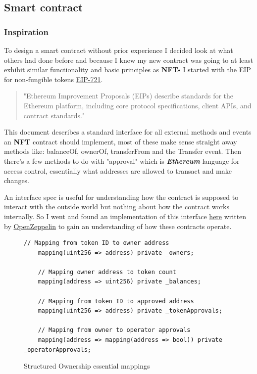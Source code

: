 \documentclass[12pt]{article}
\newcommand{\keyword}[1]{\textbf{\textit{#1}}}
\begin{document}
\subsection{Smart contract}

\subsubsection{Inspiration}

To design a smart contract without prior experience I decided look at what others had done before and because I knew my new contract was going to at least exhibit similar functionality and basic principles as \textbf{NFTs} I started with the EIP for non-fungible tokens \href{https://eips.ethereum.org/EIPS/eip-721}{EIP-721}. 

\begin{quote}
"Ethereum Improvement Proposals (EIPs) describe standards for the Ethereum platform, including core protocol specifications, client APIs, and contract standards."\cite{eip}
\end{quote}

This document describes a standard interface for all external methods and events an \textbf{NFT} contract should implement, most of these make sense straight away methods like: balanceOf, ownerOf, transferFrom and the Transfer event. Then there's a few methods to do with "approval" which is \keyword{Ethereum} language for access control, essentially what addresses are allowed to transact and make changes.

An interface spec is useful for understanding how the contract is supposed to interact with the outside world but nothing about how the contract works internally. So I went and found an implementation of this interface \href{https://github.com/OpenZeppelin/openzeppelin-contracts/blob/master/contracts/token/ERC721/ERC721.sol}{here} written by \href{https://github.com/OpenZeppelin}{OpenZeppelin} to gain an understanding of how these contracts operate.

\begin{figure}[H]
\caption{Structured Ownership essential mappings}
\centering
\begin{lstlisting}[language=Solidity]
	// Mapping from token ID to owner address
	mapping(uint256 => address) private _owners;

	// Mapping owner address to token count
	mapping(address => uint256) private _balances;

	// Mapping from token ID to approved address
	mapping(uint256 => address) private _tokenApprovals;

	// Mapping from owner to operator approvals
	mapping(address => mapping(address => bool)) private _operatorApprovals;
\end{lstlisting}
\end{figure}
\end{document}
